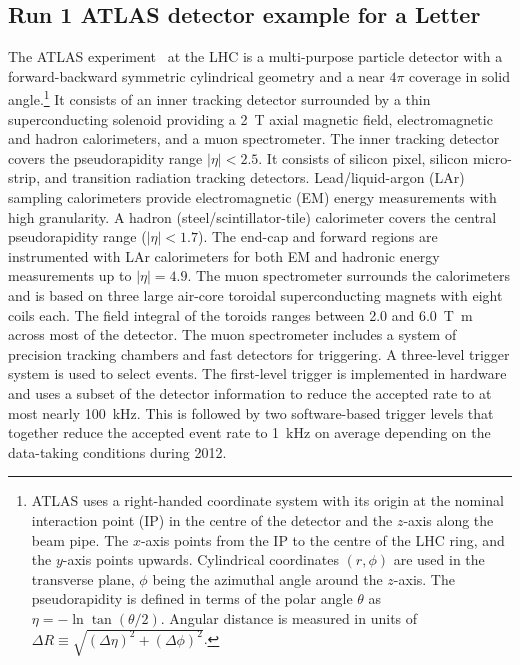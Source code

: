 \newcommand{\AtlasCoordFootnote}{%
ATLAS uses a right-handed coordinate system with its origin at the nominal interaction point (IP)
in the centre of the detector and the \(z\)-axis along the beam pipe.
The \(x\)-axis points from the IP to the centre of the LHC ring,
and the \(y\)-axis points upwards.
Cylindrical coordinates \((r,\phi)\) are used in the transverse plane, 
\(\phi\) being the azimuthal angle around the \(z\)-axis.
The pseudorapidity is defined in terms of the polar angle \(\theta\) as \(\eta = -\ln \tan(\theta/2)\).
Angular distance is measured in units of \(\Delta R \equiv \sqrt{(\Delta\eta)^{2} + (\Delta\phi)^{2}}\).}

\subsection{Run 1 ATLAS detector example for a Letter}
\label{sec:atlas1}

The ATLAS experiment~\cite{PERF-2007-01} at the LHC is a multi-purpose particle detector
with a forward-backward symmetric cylindrical geometry and a near \(4\pi\) coverage in 
solid angle.\footnote{\AtlasCoordFootnote}
It consists of an inner tracking detector surrounded by a thin superconducting solenoid
providing a \SI{2}{\tesla} axial magnetic field, electromagnetic and hadron calorimeters, and a muon spectrometer.
The inner tracking detector covers the pseudorapidity range \(|\eta| < 2.5\).
It consists of silicon pixel, silicon micro-strip, and transition radiation tracking detectors.
Lead/liquid-argon (LAr) sampling calorimeters provide electromagnetic (EM) energy measurements
with high granularity.
A hadron (steel/scintillator-tile) calorimeter covers the central pseudorapidity range (\(|\eta| < 1.7\)).
The end-cap and forward regions are instrumented with LAr calorimeters
for both EM and hadronic energy measurements up to \(|\eta| = 4.9\).
The muon spectrometer surrounds the calorimeters and is based on
three large air-core toroidal superconducting magnets with eight coils each.
The field integral of the toroids ranges between \num{2.0} and \SI{6.0}{\tesla\metre}
across most of the detector. 
The muon spectrometer includes a system of precision tracking chambers and fast detectors for triggering.
A three-level trigger system is used to select events.
The first-level trigger is implemented in hardware and uses a subset of the detector information
to reduce the accepted rate to at most nearly \SI{100}{\kHz}.
This is followed by two software-based trigger levels that
together reduce the accepted event rate to \SI{1}{\kHz} on average
depending on the data-taking conditions during 2012.


